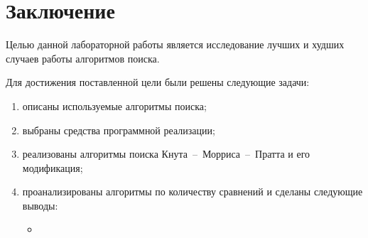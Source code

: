 \chapter*{Заключение}

Целью данной лабораторной работы является исследование лучших и худших случаев работы алгоритмов поиска.

Для достижения поставленной цели были решены следующие задачи:
\begin{enumerate}
	\item описаны используемые алгоритмы поиска;
	\item выбраны средства программной реализации;
	\item реализованы алгоритмы поиска Кнута~--~Морриса~--~Пратта и его модификация;
	\item проанализированы алгоритмы по количеству сравнений и сделаны следующие выводы:
	\begin{itemize}
		\item
	\end{itemize}
\end{enumerate}

